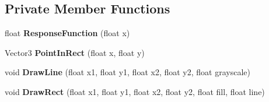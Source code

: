 \subsection*{Private Member Functions}
\begin{DoxyCompactItemize}
\item 
\mbox{\label{class_unity_editor_1_1_post_processing_1_1_bloom_model_editor_a7a2c43e6b990a050d36930b5f31df491}} 
float {\bfseries Response\+Function} (float x)
\item 
\mbox{\label{class_unity_editor_1_1_post_processing_1_1_bloom_model_editor_a479ba47c64d0ace6f888703b7339f0ee}} 
Vector3 {\bfseries Point\+In\+Rect} (float x, float y)
\item 
\mbox{\label{class_unity_editor_1_1_post_processing_1_1_bloom_model_editor_a850ec240e784fac04c1821001f76467c}} 
void {\bfseries Draw\+Line} (float x1, float y1, float x2, float y2, float grayscale)
\item 
\mbox{\label{class_unity_editor_1_1_post_processing_1_1_bloom_model_editor_a0fd887bf71f04510055cc00024646167}} 
void {\bfseries Draw\+Rect} (float x1, float y1, float x2, float y2, float fill, float line)
\end{DoxyCompactItemize}
